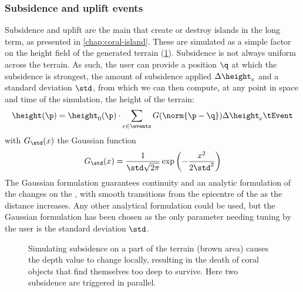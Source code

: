 \subsubsection{Subsidence and uplift events}
Subsidence and uplift are the main  that create or destroy islands in the long term, as presented in \cref{chap:coral-island}. These  are simulated as a simple factor on the height field of the generated terrain (\cref{fig:env-obj-subsidence-event}). Subsidence is not always uniform across the terrain. As such, the user can provide a position $\q$ at which the subsidence is strongest, the amount of subsidence applied $\Delta \height_e$ and a standard deviation $\std$, from which we can then compute, at any point in space and time of the simulation, the height of the terrain:
\begin{align*}
    \height(\p) = \height_0(\p) \cdot \sum_{e \in \events}{G(\norm{\p - \q})} \Delta \height_e \tEvent
\end{align*}
with $G_{\std}(x)$ the Gaussian function
\begin{align}
    G_{\std}(x) = \frac{1}{\std \sqrt{2\pi}} \exp \left(-\frac {x^{2}}{2 \std ^{2}}\right)
\end{align}
The Gaussian formulation guarantees continuity and an analytic formulation of the changes on the , with smooth transitions from the epicentre of the  as the distance increases. Any other analytical formulation could be used, but the Gaussian formulation has been chosen as the only parameter needing tuning by the user is the standard deviation $\std$.

\begin{figure}
    \caption{Simulating subsidence on a part of the terrain (brown area) causes the depth value to change locally, resulting in the death of coral objects that find themselves too deep to survive. Here two subsidence  are triggered in parallel.}
    \label{fig:env-obj-subsidence-event}
\end{figure}


